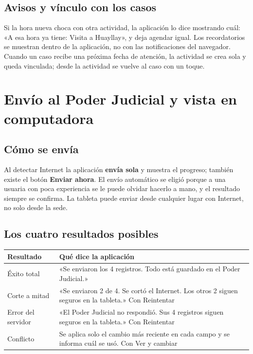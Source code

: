\documentclass[11pt,a4paper]{article}
\begin{document}
\subsection{Avisos y vínculo con los casos}

Si la hora nueva choca con otra actividad, la aplicación lo dice mostrando cuál: «A esa hora ya tiene: Visita a Huayllay», y deja agendar igual. Los recordatorios se muestran dentro de la aplicación, no con las notificaciones del navegador. Cuando un caso recibe una próxima fecha de atención, la actividad se crea sola y queda vinculada; desde la actividad se vuelve al caso con un toque.



\section{Envío al Poder Judicial y vista en computadora}

\subsection{Cómo se envía}

Al detectar Internet la aplicación \textbf{envía sola} y muestra el progreso; también existe el botón \textbf{Enviar ahora}. El envío automático se eligió porque a una usuaria con poca experiencia se le puede olvidar hacerlo a mano, y el resultado siempre se confirma. La tableta puede enviar desde cualquier lugar con Internet, no solo desde la sede.

\subsection{Los cuatro resultados posibles}

\begin{center}
\small
\begin{tabular}{@{}p{3.0cm}p{11.8cm}@{}}
\toprule
\textbf{Resultado} & \textbf{Qué dice la aplicación} \\
\midrule
Éxito total & «Se enviaron los 4 registros. Todo está guardado en el Poder Judicial.» \\
Corte a mitad & «Se enviaron 2 de 4. Se cortó el Internet. Los otros 2 siguen seguros en la tableta.» Con Reintentar \\
Error del servidor & «El Poder Judicial no respondió. Sus 4 registros siguen seguros en la tableta.» Con Reintentar \\
Conflicto & Se aplica solo el cambio más reciente en cada campo y se informa cuál se usó. Con Ver y cambiar \\
\bottomrule
\end{tabular}
\end{center}
\end{document}
